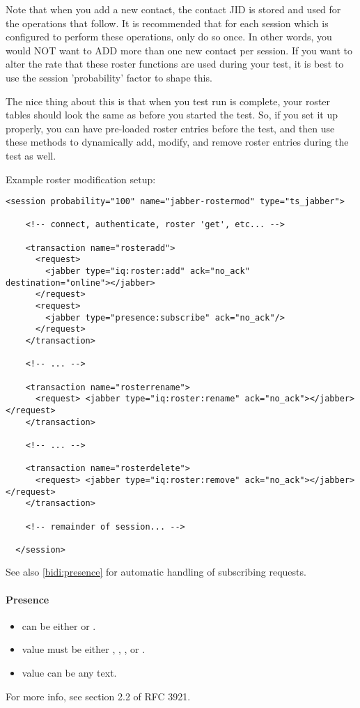 \documentclass{IDXDOC-en}
\begin{document}
Note that when you add a new contact, the contact JID is stored and used for the operations that follow. It is recommended that for each session which is configured to perform these operations, only do so once. In other words, you would NOT want to ADD more than one new contact per session. If you want to alter the rate that these roster functions are used during your test, it is best to use the session 'probability' factor to shape this.

The nice thing about this is that when you test run is complete, your roster tables should look the same as before you started the test. So, if you set it up properly, you can have pre-loaded roster entries before the test, and then use these methods to dynamically add, modify, and remove roster entries during the test as well.

Example roster modification setup:

\begin{Verbatim}
<session probability="100" name="jabber-rostermod" type="ts_jabber">

    <!-- connect, authenticate, roster 'get', etc... -->

    <transaction name="rosteradd">
      <request>
        <jabber type="iq:roster:add" ack="no_ack" destination="online"></jabber>
      </request>
      <request>
        <jabber type="presence:subscribe" ack="no_ack"/>
      </request>
    </transaction>

    <!-- ... -->

    <transaction name="rosterrename">
      <request> <jabber type="iq:roster:rename" ack="no_ack"></jabber> </request>
    </transaction>

    <!-- ... -->

    <transaction name="rosterdelete">
      <request> <jabber type="iq:roster:remove" ack="no_ack"></jabber> </request>
    </transaction>

    <!-- remainder of session... -->

  </session>
\end{Verbatim}

See also \ref{bidi:presence} for automatic handling of  subscribing requests.

\paragraph{Presence}
\begin{itemize}
\item {} can be either  or .
\item {} value must be either , , , or .
\item {} value can be any text.
\end{itemize}
For more info, see section 2.2 of RFC 3921.
\end{document}
